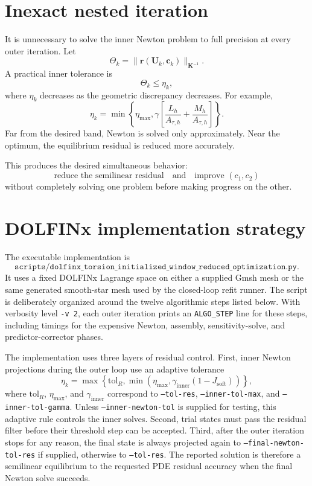 \documentclass[11pt]{article}
\newcommand{\bU}{\mathbf{U}}
\newcommand{\bc}{\mathbf{c}}
\newcommand{\br}{\mathbf{r}}
\newcommand{\bK}{\mathbf{K}}
\begin{document}
\section{Inexact nested iteration}

It is unnecessary to solve the inner Newton problem to full precision at every outer iteration.
Let
\[
\Theta_k
=
\|\br(\bU_k,\bc_k)\|_{\bK^{-1}}.
\]
A practical inner tolerance is
\[
\Theta_k
\leq
\eta_k,
\]
where $\eta_k$ decreases as the geometric discrepancy decreases. For example,
\[
\eta_k
=
\min
\left\{
\eta_{\max},
\gamma
\left[
\frac{L_h}{A_{\tau,h}}
+
\frac{M_h}{A_{\tau,h}}
\right]
\right\}.
\]
Far from the desired band, Newton is solved only approximately. Near the optimum, the equilibrium residual is reduced more accurately.

This produces the desired simultaneous behavior:
\[
\text{reduce the semilinear residual}
\quad\text{and}\quad
\text{improve }(c_1,c_2)
\]
without completely solving one problem before making progress on the other.

\section{DOLFINx implementation strategy}

The executable implementation is
\[
\texttt{scripts/dolfinx\_torsion\_initialized\_window\_reduced\_optimization.py}.
\]
It uses a fixed DOLFINx Lagrange space on either a supplied Gmsh mesh or the
same generated smooth-star mesh used by the closed-loop refit runner.  The
script is deliberately organized around the twelve algorithmic steps listed
below.  With verbosity level \texttt{-v 2}, each outer iteration prints an
\texttt{ALGO\_STEP} line for these steps, including timings for the expensive
Newton, assembly, sensitivity-solve, and predictor-corrector phases.

The implementation uses three layers of residual control.
First, inner Newton projections during the outer loop use an adaptive tolerance
\[
\eta_k
=
\max\left\{
\mathrm{tol}_R,
\min\left(
\eta_{\max},
\gamma_{\mathrm{inner}}
(1-J_{\mathrm{soft}})
\right)
\right\},
\]
where $\mathrm{tol}_R$, $\eta_{\max}$, and $\gamma_{\mathrm{inner}}$ correspond
to \texttt{--tol-res}, \texttt{--inner-tol-max}, and
\texttt{--inner-tol-gamma}.  Unless \texttt{--inner-newton-tol} is supplied for testing, this adaptive
rule controls the inner solves.  Second, trial
states must pass the residual filter before their threshold step can be
accepted.  Third, after the outer iteration stops for any reason, the final
state is always projected again to \texttt{--final-newton-tol-res} if supplied,
otherwise to \texttt{--tol-res}.  The reported solution is therefore a
semilinear equilibrium to the requested PDE residual accuracy when the final
Newton solve succeeds.
\end{document}
